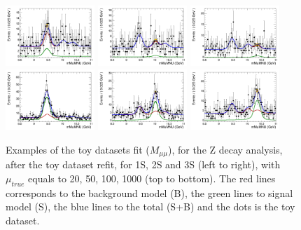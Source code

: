 \begin{figure}[!htbp]
\begin{center}
\includegraphics[width=0.3\textwidth]{figures_and_tables/modeling_xchecks/plots/ZToUpsilon1SPhoton_Cat0_signalStrenght_100/Cat0_mMuMNU_fit_s}
\includegraphics[width=0.3\textwidth]{figures_and_tables/modeling_xchecks/plots/ZToUpsilon2SPhoton_Cat0_signalStrenght_100/Cat0_mMuMNU_fit_s}
\includegraphics[width=0.3\textwidth]{figures_and_tables/modeling_xchecks/plots/ZToUpsilon3SPhoton_Cat0_signalStrenght_100/Cat0_mMuMNU_fit_s}
\includegraphics[width=0.3\textwidth]{figures_and_tables/modeling_xchecks/plots/ZToUpsilon1SPhoton_Cat0_signalStrenght_1000/Cat0_mMuMNU_fit_s}
\includegraphics[width=0.3\textwidth]{figures_and_tables/modeling_xchecks/plots/ZToUpsilon2SPhoton_Cat0_signalStrenght_1000/Cat0_mMuMNU_fit_s}
\includegraphics[width=0.3\textwidth]{figures_and_tables/modeling_xchecks/plots/ZToUpsilon3SPhoton_Cat0_signalStrenght_1000/Cat0_mMuMNU_fit_s}
\end{center}
\caption{Examples of the toy datasets fit ($M_{\mu\mu}$), for the Z decay analysis, after the toy dataset refit, for 1S, 2S and 3S (left to right), with $\mu_{true}$ equals to 20, 50, 100, 1000 (top to bottom). The red lines corresponds to the background model (B), the green lines to signal model (S), the blue lines to the total (S+B) and the dots is the toy dataset.}
\label{fig:fits_xchecks_mMuMNU_Z}
\end{figure}



